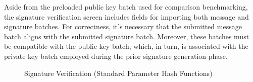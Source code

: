 \documentclass[]{final_report}
\theoremstyle{definition}
\begin{document}
Aside from the preloaded public key batch used for comparison benchmarking, the signature verification screen includes fields for importing both message and signature batches. For correctness, it's necessary that the submitted message batch aligns with the submitted signature batch. Moreover, these batches must be compatible with the public key batch, which, in turn, is associated with the private key batch employed during the prior signature generation phase.


\begin{figure}[H]
    \centering %
    
    \begin{minipage}{0.49\textwidth}
        \centering
        \caption{Signature Verification (Standard Parameter Hash Functions)}
        \label{fig:image1}
    \end{minipage}
    \hfill %
    \begin{minipage}{0.49\textwidth}
        \centering

\end{minipage}
\end{figure}
\end{document}
